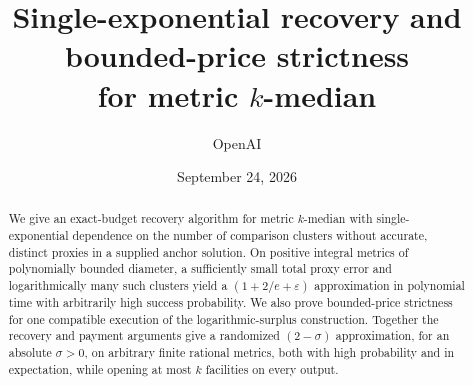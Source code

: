 \documentclass[11pt]{article}
\title{Single-exponential recovery and bounded-price strictness\\for metric $k$-median}
\author{OpenAI}
\date{September 24, 2026}
\begin{document}
\maketitle
\begin{abstract}
We give an exact-budget recovery algorithm for metric $k$-median with
single-exponential dependence on the number of comparison clusters
without accurate, distinct proxies in a supplied anchor solution.
On positive integral metrics of polynomially bounded diameter, a
sufficiently small total proxy error and logarithmically many such
clusters yield a $(1+2/e+\varepsilon)$ approximation in polynomial
time with arbitrarily high success probability. We also prove bounded-price
strictness for one compatible execution of the logarithmic-surplus
construction. Together the recovery and payment arguments give a randomized
$(2-\sigma)$ approximation, for an absolute $\sigma>0$, on arbitrary
finite rational metrics, both with high probability and in expectation,
while opening at most $k$ facilities on every output.
\end{abstract}
\tableofcontents
\clearpage










\begingroup
\raggedright


\endgroup
\end{document}
